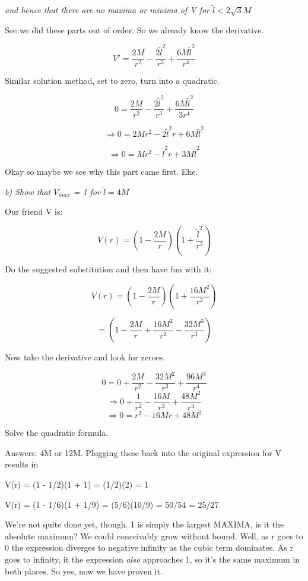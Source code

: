 \documentclass[landscape,letterpaper,10pt,english]{article}
\begin{document}
\emph{and hence that there are no maxima or minima of V for
\(\tilde l < 2\sqrt{3}M\)}

    See we did these parts out of order. So we already know the derivative.

\[ V' = \frac{2M}{r^2} - \frac{2\tilde l^2}{r^3} + \frac{6M \tilde l^2}{r^4}  \]

Similar solution method, set to zero, turn into a quadratic.

\[ 0 = \frac{2M}{r^2} - \frac{2\tilde l^2}{r^3} + \frac{6M \tilde l^2}{3r^4}  \]

\[ \Rightarrow 0 = 2Mr^2 - 2\tilde l^2r + 6M \tilde l^2  \]

\[ \Rightarrow 0 = Mr^2 - \tilde l^2r + 3M \tilde l^2  \]

Okay so maybe we see why this part came first. Ehe.

    \emph{b) Show that \(V_{max}\) = 1 for \(\tilde l = 4M\)}

    Our friend V is:

\[ V(r) = \left( 1-\frac{2M}{r} \right) \left( 1+\frac{\tilde l^2}{r^2} \right) \]

Do the suggested substitution and then have fun with it:

\[ V(r) = \left( 1-\frac{2M}{r} \right) \left( 1+\frac{16M^2}{r^2} \right) \]

    \[ = \left( 1 - \frac{2M}{r} + \frac{16M^2}{r^2} - \frac{32M^3}{r^3} \right) \]

Now take the derivative and look for zeroes.

\[ 0 = 0 + \frac{2M}{r^2} - \frac{32M^2}{r^3} + \frac{96M^3}{r^4}  \]
\[ \Rightarrow 0 + \frac{1}{r^2} - \frac{16M}{r^3} + \frac{48M^2}{r^4}  \]
\[ \Rightarrow 0 = r^2 - 16Mr + 48M^2  \]

Solve the quadratic formula.

    Answers: 4M or 12M. Plugging these back into the original expression for
V results in

V(r) = (1 - 1/2)(1 + 1) = (1/2)(2) = 1

V(r) = (1 - 1/6)(1 + 1/9) = (5/6)(10/9) = 50/54 = 25/27

We're not quite done yet, though. 1 is simply the largest MAXIMA, is it
the absolute maximum? We could conceivably grow without bound. Well, as
r goes to 0 the expression diverges to negative infinity as the cubic
term dominates. As r goes to infinity, it the expression \emph{also}
approaches 1, so it's the same maximum in both places. So yes, now we
have proven it.
\end{document}
